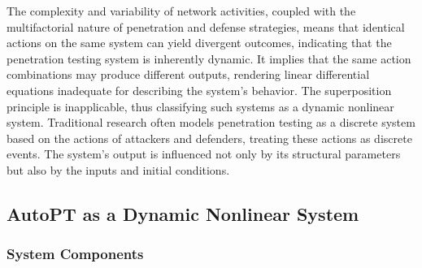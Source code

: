 
The complexity and variability of network activities, coupled with the multifactorial nature of penetration and defense strategies, means that identical actions on the same system can yield divergent outcomes, indicating that the penetration testing system is inherently dynamic. It implies that the same action combinations may produce different outputs, rendering linear differential equations inadequate for describing the system's behavior. The superposition principle is inapplicable, thus classifying such systems as a dynamic nonlinear system. Traditional research often models penetration testing as a discrete system based on the actions of attackers and defenders, treating these actions as discrete events. The system's output is influenced not only by its structural parameters but also by the inputs and initial conditions. 









\subsection{AutoPT as a Dynamic Nonlinear System}
\subsubsection{System Components}

